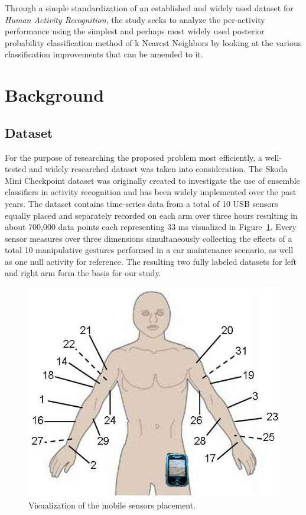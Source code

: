 \documentclass{sig-alternate}
\begin{document}
Through a simple standardization of an established and widely used dataset for \textit{Human Activity Recognition}, the study seeks to analyze the per-activity performance using the simplest and perhaps most widely used posterior probability classification method of k Nearest Neighbors by looking at the various classification improvements that can be amended to it.


\section{Background}

\subsection{Dataset}
For the purpose of researching the proposed problem most efficiently, a well-tested and widely researched dataset was taken into consideration. The Skoda Mini Checkpoint dataset was originally created to investigate the use of ensemble classifiers in activity recognition and has been widely implemented over the past years\cite{Zappi08}. The dataset contains time-series data from a total of 10 USB sensors equally placed and separately recorded on each arm over three hours resulting in about 700,000 data points each representing 33 ms visualized in Figure~\ref{fig:body_sensors}. Every sensor measures over three dimensions simultaneously collecting the effects of a total 10 manipulative gestures performed in a car maintenance scenario, as well as one null activity for reference. The resulting two fully labeled datasets for left and right arm form the basis for our study.

\begin{figure}[t]
\begin{center}
  \includegraphics[width=0.6\linewidth]{non_tech_imgs/Body_Sensors.png}
\end{center}
  \caption{Visualization of the mobile sensors placement.}
  \label{fig:body_sensors}
\end{figure}
\end{document}
